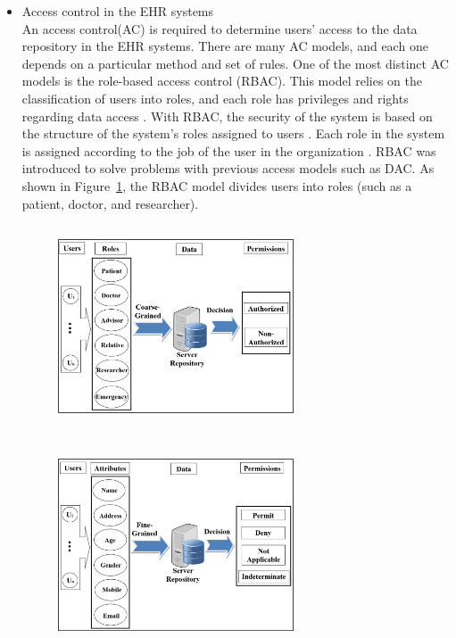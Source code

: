 \documentclass[journal,article,submit,moreauthors,pdftex]{Definitions/mdpi}
\begin{document}
\begin{itemize}
\item Access control in the EHR systems\\
An access control(AC) is required to determine users' access to the data repository in the EHR systems. There are many AC models, and each one depends on a particular method and set of rules.
One of the most distinct AC models is the role-based access control (RBAC). This model relies on the classification of users into roles, and each role has privileges and rights regarding data access \cite{fp12}. With RBAC, the security of the system is based on the structure of the system's roles assigned to users \cite{fp18}.  Each role in the system is assigned according to the job of the user in the organization \cite{fp37}. RBAC was introduced to solve problems with previous access models such as DAC. As shown in Figure~\ref{fig:rbac}, the RBAC model divides users into roles (such as a patient, doctor, and researcher).
\begin{figure}[ht!]
\centering
\begin{minipage}{.5\textwidth}
  \centering
  \includegraphics[width=7cm,height=6cm]{RBAC.png} %
  \label{fig:rbac}
\end{minipage}%
\begin{minipage}{.5\textwidth}
  \centering
  \includegraphics[width=7cm,height=6cm]{ABAC}

\end{minipage}
\end{figure}
\end{itemize}
\end{document}
